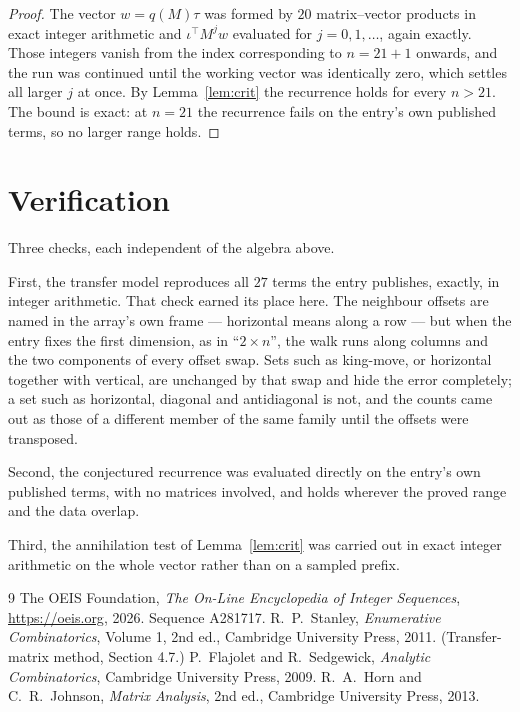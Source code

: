 \documentclass[11pt,a4paper]{article}
\theoremstyle{plain}
\theoremstyle{definition}
\begin{document}
\begin{proof}
The vector $w=q(M)\tau$ was formed by $20$ matrix--vector products in exact integer
arithmetic and $\iota^{\!\top}M^{j}w$ evaluated for $j=0,1,\dots$, again exactly. Those
integers vanish from the index corresponding to $n=21+1$ onwards, and the run was
continued until the working vector was identically zero, which settles all larger $j$ at once.
By Lemma~\ref{lem:crit} the recurrence holds for every $n>21$. The bound is exact: at $n=21$ the recurrence fails on the entry's own published terms, so no larger range holds.
\end{proof}

\section{Verification}

Three checks, each independent of the algebra above.

First, the transfer model reproduces all $27$ terms the entry publishes, exactly, in
integer arithmetic. That check earned its place here. The neighbour offsets are named in the
array's own frame --- horizontal means along a row --- but when the entry fixes the first
dimension, as in ``$2\times n$'', the walk runs along columns and the two components of every
offset swap. Sets such as king-move, or horizontal together with vertical, are unchanged by
that swap and hide the error completely; a set such as horizontal, diagonal and antidiagonal
is not, and the counts came out as those of a different member of the same family until the
offsets were transposed.

Second, the conjectured recurrence was evaluated directly on the entry's own published terms,
with no matrices involved, and holds wherever the proved range and the data overlap.

Third, the annihilation test of Lemma~\ref{lem:crit} was carried out in exact integer
arithmetic on the whole vector rather than on a sampled prefix.

\begin{thebibliography}{9}
 The OEIS Foundation, \emph{The On-Line Encyclopedia of Integer
Sequences}, \url{https://oeis.org}, 2026. Sequence A281717.
 R.~P.~Stanley, \emph{Enumerative Combinatorics}, Volume 1, 2nd ed.,
Cambridge University Press, 2011. (Transfer-matrix method, Section 4.7.)
 P.~Flajolet and R.~Sedgewick, \emph{Analytic Combinatorics}, Cambridge
University Press, 2009.
 R.~A.~Horn and C.~R.~Johnson, \emph{Matrix Analysis}, 2nd ed., Cambridge
University Press, 2013.
\end{thebibliography}
\end{document}
